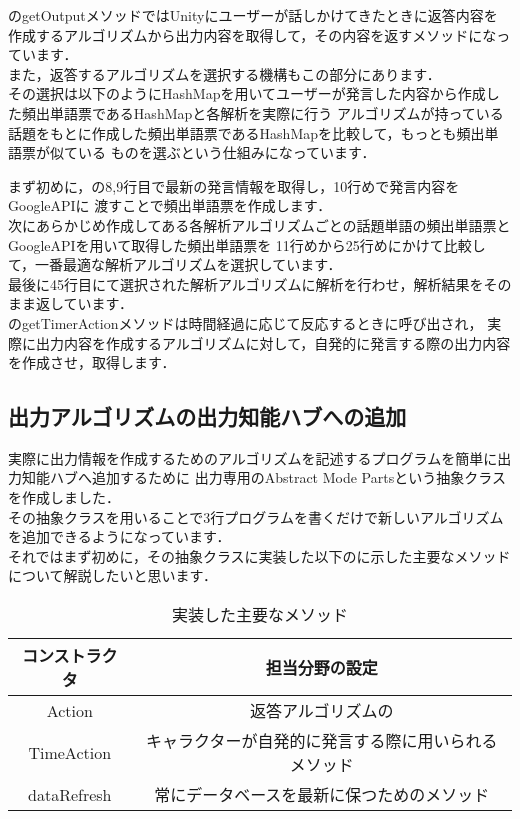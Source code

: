 のgetOutputメソッドではUnityにユーザーが話しかけてきたときに返答内容を
作成するアルゴリズムから出力内容を取得して，その内容を返すメソッドになっています．\\
また，返答するアルゴリズムを選択する機構もこの部分にあります．
\\
その選択は以下のようにHashMapを用いてユーザーが発言した内容から作成した頻出単語票であるHashMapと各解析を実際に行う
アルゴリズムが持っている話題をもとに作成した頻出単語票であるHashMapを比較して，もっとも頻出単語票が似ている
ものを選ぶという仕組みになっています．\\


まず初めに，の8,9行目で最新の発言情報を取得し，10行めで発言内容をGoogleAPIに
渡すことで頻出単語票を作成します．
\\
次にあらかじめ作成してある各解析アルゴリズムごとの話題単語の頻出単語票とGoogleAPIを用いて取得した頻出単語票を
11行めから25行めにかけて比較して，一番最適な解析アルゴリズムを選択しています．
\\
最後に45行目にて選択された解析アルゴリズムに解析を行わせ，解析結果をそのまま返しています．\\


のgetTimerActionメソッドは時間経過に応じて反応するときに呼び出され，
実際に出力内容を作成するアルゴリズムに対して，自発的に発言する際の出力内容を作成させ，取得します．\\



\subsection{出力アルゴリズムの出力知能ハブへの追加}
実際に出力情報を作成するためのアルゴリズムを記述するプログラムを簡単に出力知能ハブへ追加するために
出力専用のAbstract Mode Partsという抽象クラスを作成しました．\\

その抽象クラスを用いることで3行プログラムを書くだけで新しいアルゴリズムを追加できるようになっています．\\

それではまず初めに，その抽象クラスに実装した以下のに示した主要なメソッドについて解説したいと思います．\\

\begin{table}[tbh]
	\caption{実装した主要なメソッド} \label{tab:parts}
	\begin{center}
		\begin{tabular}[htb]{c|c}
		\hline
		コンストラクタ & 担当分野の設定 \\
		\hline
		Action & 返答アルゴリズムの \\
		\hline
		TimeAction & キャラクターが自発的に発言する際に用いられるメソッド \\
		\hline
		dataRefresh & 常にデータベースを最新に保つためのメソッド \\
		\hline
		\end{tabular}
	\end{center}
\end{table}

